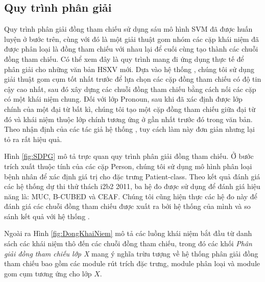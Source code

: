 \subsection*{Quy trình phân giải}
Quy trình phân giải đồng tham chiếu sử dụng sáu mô hình SVM đã được huấn luyện ở bước trên, cùng với đó là một giải thuật gom nhóm các cặp khái niệm đã được phân loại là đồng tham chiếu với nhau lại để cuối cùng tạo thành các chuỗi đồng tham chiếu. Có thể xem đây là quy trình mang đi ứng dụng thực tế để phân giải cho những văn bản HSXV mới. Dựa vào hệ thống \cite{YanXu2012}, chúng tôi sử dụng giải thuật gom cụm tốt nhất trước để lựa chọn các cặp đồng tham chiếu có độ tin cậy cao nhất, sau đó xây dựng các chuỗi đồng tham chiếu bằng cách nối các cặp có một khái niệm chung. Đối với lớp Pronoun, sau khi đã xác định được lớp chính của một đại từ bất kì, chúng tôi tạo một cặp đồng tham chiếu giữa đại từ đó và khái niệm thuộc lớp chính tương ứng ở gần nhất trước đó trong văn bản. Theo nhận định của các tác giả hệ thống \cite{YanXu2012}, tuy cách làm này đơn giản nhưng lại tỏ ra rất hiệu quả.

Hình \ref{fig:SDPG} mô tả trực quan quy trình phân giải đồng tham chiếu. Ở bước trích xuất thuộc tính của các cặp Person, chúng tôi sử dụng mô hình phân loại bệnh nhân để xác định giá trị cho đặc trưng Patient-class. Theo kết quả đánh giá các hệ thống dự thi thử thách i2b2 2011, ba hệ đo được sử dụng để đánh giá hiệu năng là: MUC, B-CUBED và CEAF. Chúng tôi cũng hiện thực các hệ đo này để đánh giá các chuỗi đồng tham chiếu được xuất ra bởi hệ thống của mình và so sánh kết quả với hệ thống \cite{YanXu2012}. 

Ngoài ra Hình \ref{fig:DongKhaiNiem} mô tả các luồng khái niệm bắt đầu từ danh sách các khái niệm thô đến các chuỗi đồng tham chiếu, trong đó các khối \emph{Phân giải đồng tham chiếu lớp X} mang ý nghĩa trừu tượng về hệ thống phân giải đồng tham chiếu bao gồm các module rút trích đặc trưng, module phân loại và module gom cụm tương ứng cho lớp $X$.

